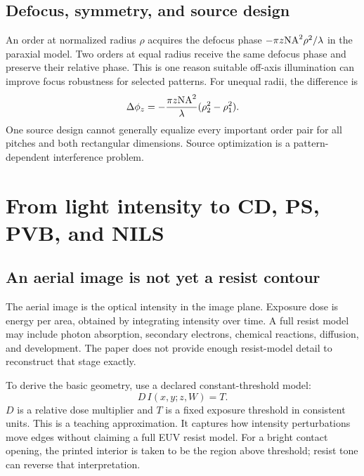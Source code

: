 
\section{Defocus, symmetry, and source design}
An order at normalized radius $\rho$ acquires the defocus phase
$-\pi z\mathrm{NA}^2\rho^2/\lambda$ in the paraxial model.
Two orders at equal radius receive the same defocus phase and preserve
their relative phase. This is one reason suitable off-axis illumination
can improve focus robustness for selected patterns.
For unequal radii, the difference is
\[
\Delta\phi_z=-\frac{\pi z\mathrm{NA}^2}{\lambda}
(\rho_2^2-\rho_1^2).
\]
One source design cannot generally equalize every important order pair
for all pitches and both rectangular dimensions.
Source optimization is a pattern-dependent interference problem.

\chapter{From light intensity to CD, PS, PVB, and NILS}\label{ch:metrics}

\section{An aerial image is not yet a resist contour}
The aerial image is the optical intensity in the image plane.
Exposure dose is energy per area, obtained by integrating intensity
over time. A full resist model may include photon absorption,
secondary electrons, chemical reactions, diffusion, and development.
The paper does not provide enough resist-model detail to reconstruct
that stage exactly.

To derive the basic geometry, use a declared constant-threshold model:
\begin{equation}
D\,I(x,y;z,W)=T.
\label{eq:threshold}
\end{equation}
$D$ is a relative dose multiplier and $T$ is a fixed exposure threshold
in consistent units. This is a teaching approximation. It captures how
intensity perturbations move edges without claiming a full EUV resist model.
For a bright contact opening, the printed interior is taken to be the
region above threshold; resist tone can reverse that interpretation.

